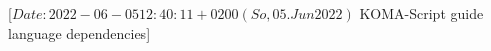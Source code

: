%
%
%
%
%
%
%
%
                 [$Date: 2022-06-05 12:40:11 +0200 (So, 05. Jun 2022) $
                  KOMA-Script guide language dependencies]
%
%
\newcommand*{\GuideSubject}{Die Anleitung}
\newcommand*{\GuideTitle}{\KOMAScript}%
\newcommand*{\GuideSubTitle}{ein wandelbares \LaTeXe-Paket}%
\newcommand*{\GuideAuthorHeadline}{Autoren des \KOMAScript-Pakets}%
\newcommand*{\GuideTranslatorHeadline}{An der deutschen \"Ubersetzung dieser
  Anleitung haben mitgewirkt: }
\newcommand*{\GuideWarrantyHeadline}{Rechtliche Hinweise:}%
